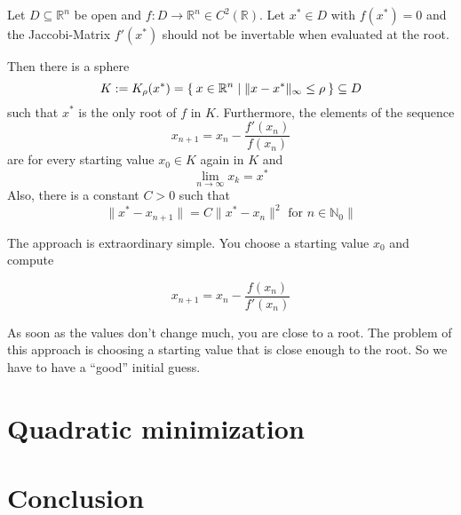 \documentclass[a4paper]{scrartcl}
\theoremstyle{break}
\def\mdr{\ensuremath{\mathbb{R}}}
\theoremstyle{nonumberplain}
\def\mdr{\ensuremath{\mathbb{R}}}
\begin{document}
\begin{theorem}
    Let $D \subseteq \mdr^n$ be open and $f: D \rightarrow \mdr^n \in C^2(\mdr)$.
    Let $x^* \in D$ with $f(x^*) = 0$ and the Jaccobi-Matrix $f'(x^*)$
    should not be invertable when evaluated at the root.

    Then there is a sphere 
    \[K := K_\rho(x^*) = \Set{x \in \mdr^n | \|x- x^*\|_\infty \leq \rho} \subseteq D\]
    such that $x^*$ is the only root of $f$ in $K$. Furthermore,
    the elements of the sequence
    \[ x_{n+1} = x_n - \frac{f'(x_n)}{f(x_n)}\]
    are for every starting value $x_0 \in K$ again in $K$ and
    \[\lim_{n \rightarrow \infty} x_k = x^*\]
    Also, there is a constant $C > 0$ such that
    \[\|x^* - x_{n+1} \| = C \|x^* - x_n\|^2 \text{ for } n \in \mathbb{N}_0\|\]
\end{theorem}

The approach is extraordinary simple. You choose a starting value
$x_0$ and compute

\[x_{n+1} = x_n - \frac{f(x_n)}{f'(x_n)}\]

As soon as the values don't change much, you are close to a root.
The problem of this approach is choosing a starting value that is
close enough to the root. So we have to have a \enquote{good}
initial guess.

\section{Quadratic minimization}

\section{Conclusion}
\end{document}
